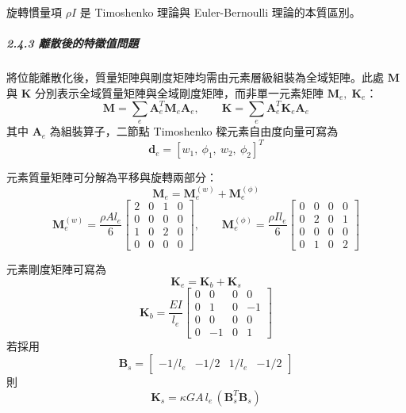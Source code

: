 ﻿\documentclass[UTF8, a4paper, 12pt]{ctexart}
\begin{document}
旋轉慣量項 $\rho I$ 是 Timoshenko 理論與 Euler-Bernoulli 理論的本質區別。

\subparagraph{2.4.3 離散後的特徵值問題}

將位能離散化後，質量矩陣與剛度矩陣均需由元素層級組裝為全域矩陣。此處 $\mathbf{M}$ 與 $\mathbf{K}$ 分別表示全域質量矩陣與全域剛度矩陣，而非單一元素矩陣 $\mathbf{M}_e,\;\mathbf{K}_e$：
\begin{equation}
  \mathbf{M}=\sum_{e} \mathbf{A}_e^{T} \mathbf{M}_e \mathbf{A}_e,\qquad
  \mathbf{K}=\sum_{e} \mathbf{A}_e^{T} \mathbf{K}_e \mathbf{A}_e
\end{equation}
其中 $\mathbf{A}_e$ 為組裝算子，二節點 Timoshenko 樑元素自由度向量可寫為
\begin{equation}
  \mathbf{d}_e=[w_1,\ \phi_1,\ w_2,\ \phi_2]^T
\end{equation}

元素質量矩陣可分解為平移與旋轉兩部分：
\begin{equation}
  \mathbf{M}_e=\mathbf{M}_e^{(w)}+\mathbf{M}_e^{(\phi)}
\end{equation}
\begin{equation}
  \mathbf{M}_e^{(w)}=\frac{\rho A l_e}{6}
  \begin{bmatrix}
    2&0&1&0\\
    0&0&0&0\\
    1&0&2&0\\
    0&0&0&0
  \end{bmatrix},\qquad
  \mathbf{M}_e^{(\phi)}=\frac{\rho I l_e}{6}
  \begin{bmatrix}
    0&0&0&0\\
    0&2&0&1\\
    0&0&0&0\\
    0&1&0&2
  \end{bmatrix}
\end{equation}

元素剛度矩陣可寫為
\begin{equation}
  \mathbf{K}_e=\mathbf{K}_b+\mathbf{K}_s
\end{equation}
\begin{equation}
  \mathbf{K}_b=\frac{EI}{l_e}
  \begin{bmatrix}
    0&0&0&0\\
    0&1&0&-1\\
    0&0&0&0\\
    0&-1&0&1
  \end{bmatrix}
\end{equation}
若採用
\begin{equation}
  \mathbf{B}_s=\begin{bmatrix}-1/l_e&-1/2&1/l_e&-1/2\end{bmatrix}
\end{equation}
則
\begin{equation}
  \mathbf{K}_s=\kappa GA\,l_e\,(\mathbf{B}_s^T \mathbf{B}_s)
\end{equation}
\end{document}
